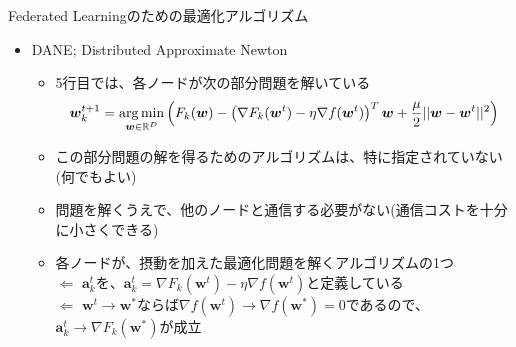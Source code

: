\documentclass[dvipdfmx,notheorems,t]{beamer}
\begin{document}
\begin{frame}{Federated Learningのための最適化アルゴリズム}

\begin{itemize}
	\item DANE; Distributed Approximate Newton
	\begin{itemize}
		\item 5行目では、各ノードが次の部分問題を解いている
		\begin{equation}
			\bm{w}_k^{t + 1} = \operatorname*{arg\,min}_{\bm{w} \in \mathbb{R}^D} \left( F_k(\bm{w}) - \left( \nabla F_k(\bm{w}^t) - \eta \nabla f(\bm{w}^t) \right)^T \bm{w} + \frac{\mu}{2} || \bm{w} - \bm{w}^t ||^2 \right) \nonumber
		\end{equation}
		
		\item この部分問題の解を得るためのアルゴリズムは、特に指定されていない(何でもよい)
		\item 問題を解くうえで、他のノードと通信する必要がない(通信コストを十分に小さくできる)
		\newline
		
		\item 各ノードが、摂動を加えた最適化問題を解くアルゴリズムの1つ \\
		$\Leftarrow$ $\bm{a}_k^t$を、$\bm{a}_k^t = \nabla F_k(\bm{w}^t) - \eta \nabla f(\bm{w}^t)$と定義している \\
		$\Leftarrow$ $\bm{w}^t \to \bm{w}^*$ならば$\nabla f(\bm{w}^t) \to \nabla f(\bm{w}^*) = 0$であるので、$\bm{a}_k^t \to \nabla F_k(\bm{w}^*)$が成立
	\end{itemize}
\end{itemize}

\end{frame}
\end{document}
